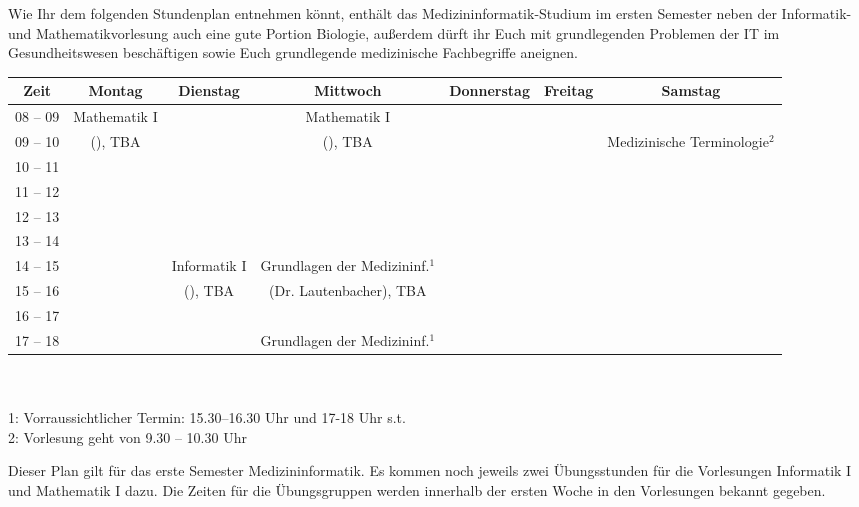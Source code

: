 Wie Ihr dem folgenden Stundenplan entnehmen könnt, enthält das Medizininformatik-Studium im ersten Semester neben der Informatik- und Mathematikvorlesung auch eine gute Portion Biologie, außerdem dürft ihr Euch mit grundlegenden Problemen der IT im Gesundheitswesen beschäftigen sowie Euch grundlegende medizinische Fachbegriffe aneignen.

\begin{minipage}{\textwidth}
    \footnotesize
\begin{center}
	\begin{table}[]
	\begin{tabular}{|c|c|c|c|c|c|c|}
	\hline
	 Zeit     &    Montag                    & Dienstag          & Mittwoch               	  	& Donnerstag & Freitag 	& Samstag\\ \hline\hline
	 08 -- 09 &    Mathematik I              &                   & Mathematik I      	  	&  &  			&\\ \cline{1-1} \cline{3-3} \cline{5-7} 
	 09 -- 10 &    (\Matheprof), TBA         &                   & (\Matheprof), TBA 	  	&  &  		       	& Medizinische Terminologie$^2$\\ \hline
	 10 -- 11 &                              &                   &                   	  	&  &  			&\\ \cline{1-1} \cline{3-7} 
	 11 -- 12 &                              &                   &                   	  	&  &  			&\\ \hline
	 12 -- 13 &                              &                   &                   	  	&  &  			&\\ \hline
	 13 -- 14 &                              &                   &                   	  	&  &  			&\\ \hline
	 14 -- 15 &                              & Informatik I      & Grundlagen der Medizininf.$^1$ 	&  &  			&\\ \cline{1-2} \cline{4-7} 
	 15 -- 16 &                              & (\Infoprof), TBA  & (Dr. Lautenbacher), TBA    	&  &  			&\\ \cline{1-3} \cline{5-7}
	 16 -- 17 &                              &                   &                   	  	&  &  			&\\ \hline
	 17 -- 18 &                              &                   & Grundlagen der Medizininf.$^1$   &  &  			&\\ \hline
	\end{tabular}
	\end{table}
    ~\\
\scriptsize\\
1: Vorraussichtlicher Termin: 15.30--16.30 Uhr und 17-18 Uhr s.t.\\
2: Vorlesung geht von 9.30 -- 10.30 Uhr
\end{center}
\end{minipage}
Dieser Plan gilt für das erste Semester Medizininformatik. Es kommen noch jeweils zwei Übungsstunden für die Vorlesungen 
Informatik I und Mathematik I dazu. Die Zeiten für die Übungsgruppen werden innerhalb der ersten Woche in den Vorlesungen bekannt gegeben.
